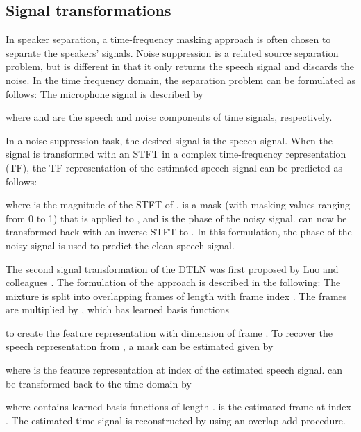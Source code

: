 \documentclass[a4paper]{article}
\begin{document}
\subsection{Signal transformations}
In speaker separation, a time-frequency masking approach is often chosen to separate the speakers' signals. 
Noise suppression is a related source separation problem, but is different in that it only returns the speech signal and discards the noise. 
In the time frequency domain, the separation problem can be formulated as follows:
The microphone signal  is described by

where  and  are the speech and noise components of time signals, respectively. 

In a noise suppression task, the desired signal is the speech signal. When the signal  is transformed with an STFT in a complex time-frequency representation (TF), the TF representation of the estimated speech signal  can be predicted as follows:

where  is the magnitude of the STFT of .  is a mask (with masking values ranging from 0 to 1) that is applied to , and  is the phase of the noisy signal.  can now be transformed back with an inverse STFT to . 
In this formulation, the phase of the noisy signal is used to predict the clean speech signal. 

The second signal transformation of the DTLN was first proposed by Luo and colleagues \cite{luo2018tasnet}. 
The formulation of the approach is described in the following: The mixture is split into overlapping frames  of length  with frame index . 
The frames are multiplied by , which has  learned basis functions

to create the feature representation  with dimension  of frame . To recover the speech representation  from , a mask  can be estimated given by

where  is the feature representation at index  of the estimated speech signal.  can be transformed back to the time domain by

where  contains  learned basis functions of length .  is the estimated frame at index .
The estimated time signal  is reconstructed by using an overlap-add procedure.
\end{document}
